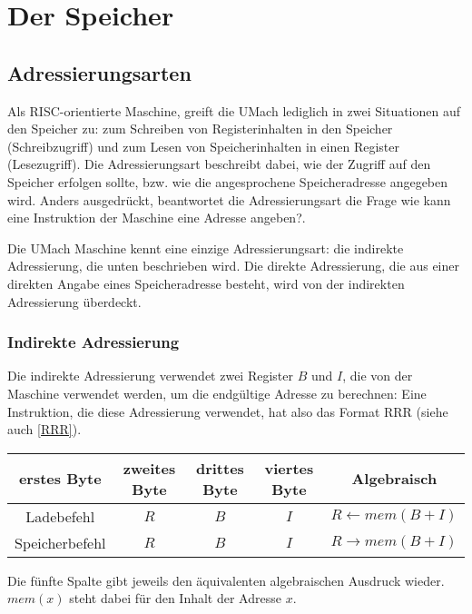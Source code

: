\section{Der Speicher}
\label{sec:Speicher}

\subsection{Adressierungsarten}
\label{subsec:Adressierungsarten}

Als RISC-orientierte Maschine, greift die UMach lediglich in zwei Situationen
auf den Speicher zu: zum Schreiben von Registerinhalten in den Speicher
(Schreibzugriff) und zum Lesen von Speicherinhalten in einen Register
(Lesezugriff).  Die \gls{Adressierungsart} beschreibt dabei, wie der Zugriff
auf den Speicher erfolgen sollte, bzw. wie die angesprochene Speicheradresse
angegeben wird. Anders ausgedrückt, beantwortet die Adressierungsart die Frage
\glqq wie kann eine Instruktion der Maschine eine Adresse angeben?\grqq. 

Die UMach Maschine kennt eine einzige Adressierungsart: die indirekte
Adressierung, die unten beschrieben wird. Die direkte Adressierung, die aus
einer direkten Angabe eines Speicheradresse besteht, wird von der indirekten
Adressierung überdeckt.

\subsubsection{Indirekte Adressierung}

Die indirekte Adressierung verwendet zwei Register $B$ und $I$, die
von der Maschine verwendet werden, um die endgültige Adresse zu berechnen:
Eine Instruktion, die diese Adressierung verwendet, hat also das Format RRR
(siehe auch \ref{RRR}).
\begin{center}
  \begin{tabular}{|*{4}{c|}|c|} \hline
    erstes Byte    & zweites Byte  & drittes Byte  & viertes Byte & Algebraisch
\\\hline\hline
    Ladebefehl     & $R$  & $B$  & $I$  & $R \gets mem(B + I)$ \\\hline
    Speicherbefehl & $R$  & $B$  & $I$  & $R \to   mem(B + I)$ \\\hline
  \end{tabular}
\end{center}
Die fünfte Spalte gibt jeweils den äquivalenten algebraischen Ausdruck wieder.
$mem(x)$ steht dabei für den Inhalt der Adresse $x$.


